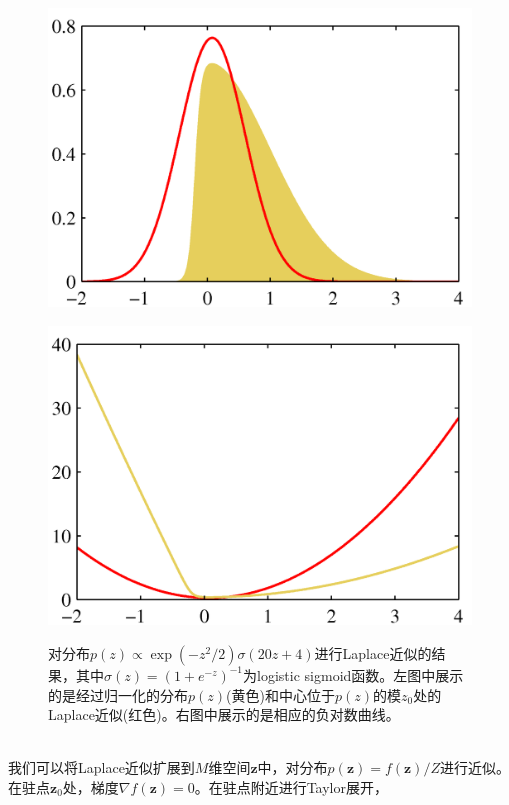 \documentclass[b5paper]{book}
\numberwithin{equation}{chapter}
\begin{document}
{\begin{figure}[ht]
\begin{minipage}[t]{0.5\linewidth}
		\includegraphics[scale=0.8]{Images/4-14a.png}
		\label{fig:4-14a}
		\end{minipage}
		\begin{minipage}[t]{0.5\linewidth}
		\centering
		\includegraphics[scale=0.8]{Images/4-14b.png}
		\label{fig:4-14b}
		\end{minipage}
		\caption{对分布$p(z) \propto \exp(-z^2/2)\sigma(20z+4)$进行Laplace近似的结果，其中$\sigma(z)=(1+e^{-z})^{-1}$为logistic sigmoid函数。左图中展示的是经过归一化的分布$p(z)$(黄色)和中心位于$p(z)$的模$z_0$处的Laplace近似(红色)。右图中展示的是相应的负对数曲线。}
	\end{figure}
	\\
	\indent 我们可以将Laplace近似扩展到$M$维空间$\mathbf{z}$中，对分布$p(\mathbf{z}) = f(\mathbf{z})/Z $进行近似。在驻点$\mathbf{z}_0$处，梯度$\nabla f(\mathbf{z}) = 0$。在驻点附近进行Taylor展开，
}
\end{document}
